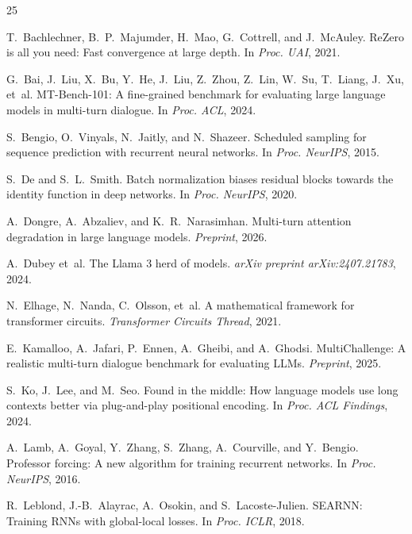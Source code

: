 \documentclass[11pt,a4paper]{article}
\begin{document}
\begin{thebibliography}{25}

T.~Bachlechner, B.~P.~Majumder, H.~Mao, G.~Cottrell, and J.~McAuley. {ReZero} is all you need: Fast convergence at large depth. In \emph{Proc. UAI}, 2021.

G.~Bai, J.~Liu, X.~Bu, Y.~He, J.~Liu, Z.~Zhou, Z.~Lin, W.~Su, T.~Liang, J.~Xu, et~al. {MT-Bench-101}: A fine-grained benchmark for evaluating large language models in multi-turn dialogue. In \emph{Proc. ACL}, 2024.

S.~Bengio, O.~Vinyals, N.~Jaitly, and N.~Shazeer. Scheduled sampling for sequence prediction with recurrent neural networks. In \emph{Proc. NeurIPS}, 2015.

S.~De and S.~L.~Smith. Batch normalization biases residual blocks towards the identity function in deep networks. In \emph{Proc. NeurIPS}, 2020.

A.~Dongre, A.~Abzaliev, and K.~R.~Narasimhan. Multi-turn attention degradation in large language models. \emph{Preprint}, 2026.

A.~Dubey et~al. The {Llama} 3 herd of models. \emph{arXiv preprint arXiv:2407.21783}, 2024.

N.~Elhage, N.~Nanda, C.~Olsson, et~al. A mathematical framework for transformer circuits. \emph{Transformer Circuits Thread}, 2021.

E.~Kamalloo, A.~Jafari, P.~Ennen, A.~Gheibi, and A.~Ghodsi. {MultiChallenge}: A realistic multi-turn dialogue benchmark for evaluating LLMs. \emph{Preprint}, 2025.

S.~Ko, J.~Lee, and M.~Seo. Found in the middle: How language models use long contexts better via plug-and-play positional encoding. In \emph{Proc. ACL Findings}, 2024.

A.~Lamb, A.~Goyal, Y.~Zhang, S.~Zhang, A.~Courville, and Y.~Bengio. Professor forcing: A new algorithm for training recurrent networks. In \emph{Proc. NeurIPS}, 2016.

R.~Leblond, J.-B.~Alayrac, A.~Osokin, and S.~Lacoste-Julien. {SEARNN}: Training {RNN}s with global-local losses. In \emph{Proc. ICLR}, 2018.


\end{thebibliography}
\end{document}
